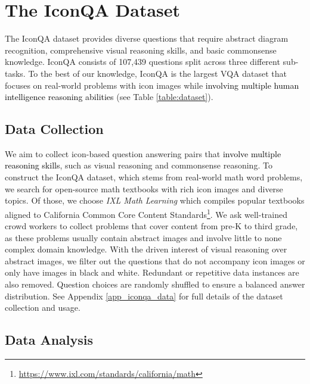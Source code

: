 \documentclass{article}
\begin{document}
\section{The IconQA Dataset}
\label{sec:iconqa}

The IconQA dataset provides diverse questions that require abstract diagram recognition, comprehensive visual reasoning skills, and basic commonsense knowledge. IconQA consists of 107,439 questions split across three different sub-tasks. To the best of our knowledge, IconQA is the largest VQA dataset that focuses on real-world problems with icon images while \textcolor{black}{involving multiple human intelligence reasoning abilities} (see Table \ref{table:dataset}). 




\subsection{Data Collection}

We aim to collect icon-based question answering pairs that \textcolor{black}{involve multiple reasoning skills}, such as visual reasoning and commonsense reasoning. To construct the IconQA dataset, which stems from real-world math word problems, we search for open-source math textbooks with rich icon images and diverse topics. Of those, we choose \textit{IXL Math Learning} which compiles popular textbooks aligned to California Common Core Content Standards\footnote{\url{https://www.ixl.com/standards/california/math}}. We ask well-trained crowd workers to collect problems that cover content from pre-K to third grade, as these problems usually contain abstract images and involve little to none complex domain knowledge. With the driven interest of visual reasoning over abstract images, we filter out the questions that do not accompany icon images or only have images in black and white. Redundant or repetitive data instances are also removed. Question choices are randomly shuffled to ensure a balanced answer distribution. See Appendix \ref{app_iconqa_data} for full details of the dataset collection and usage.




\subsection{Data Analysis}
\label{sec:data_analysis}
\end{document}
